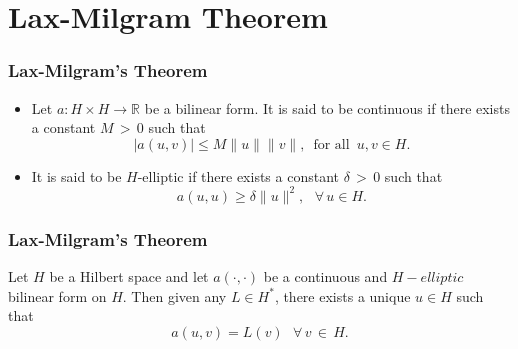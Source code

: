 \documentclass[7pt]{beamer}
\newcommand{\R}{\mathbb R}
\begin{document}
\section{Lax-Milgram Theorem}
\begin{frame}
 \frametitle{Lax-Milgram's Theorem}
\begin{Definition}
\begin{itemize}
\item Let $a:H\times H\rightarrow \R$ be a bilinear form. It is said to be continuous if there exists a constant $M\,>\,0$ such that
\begin{equation}
|a(u,v)|\leq M\|u\| \|v\|,\,\,\,\text{for all}\,\,\,u,v\in H.
\end{equation}
\item It is said to be $H$-elliptic if there exists a constant $\delta
\,>\,0$ such that
\begin{equation}
a(u,u)\geq \delta \|u\|^2,\,\,\,\,\forall\,u\in H.
\end{equation}
\end{itemize}
\end{Definition}
\end{frame}

 \begin{frame}
\frametitle{Lax-Milgram's Theorem}
\begin{theorem}
Let $H$ be a Hilbert space and let $a(\cdot,\cdot)$ be a continuous and $H-elliptic$ bilinear form on $H$. Then given any $L\in H^*$, there exists a unique $u\in H$ such that
\begin{equation}
a(u,v) = L(v)\,\,\,\,\forall\,v\,\in\,H.
\end{equation}
\label{laxm}
\end{theorem}

\end{frame}
\end{document}
